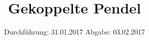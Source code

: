 

\subject{V106}
\title{Gekoppelte Pendel}
\date{
	\centering
	Durchführung: 31.01.2017
	\hspace{3em}
	Abgabe: 03.02.2017
}



\maketitle
\thispagestyle{empty}
\tableofcontents
\newpage



%




\printbibliography


